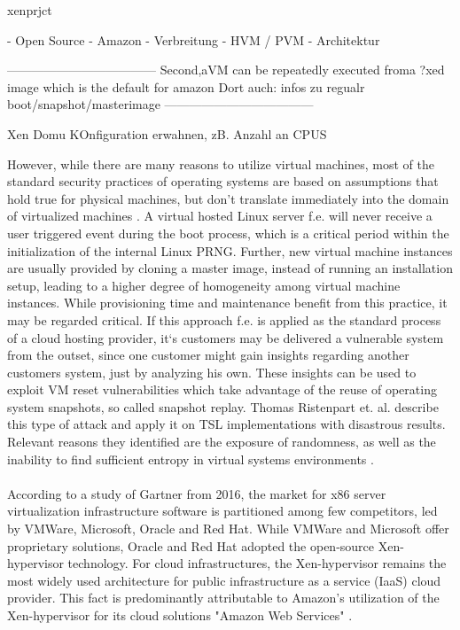 xenprjct

- Open Source
- Amazon
- Verbreitung 
- HVM / PVM
- Architektur

------------------------------------
\cite{everspaugh2014not}
Second,aVM  can be repeatedly executed froma ?xed image which is the default for amazon
Dort auch: infos zu regualr boot/snapshot/masterimage
------------------------------------

Xen Domu KOnfiguration erwahnen, zB. Anzahl an CPUS

However, while there are many reasons to utilize virtual machines, most of the standard security practices of operating systems are based on assumptions that hold true for physical machines, but don't translate immediately into the domain of virtualized machines \cite{kerrigan2012study}. A virtual hosted Linux server f.e. will never receive a user triggered event during the boot process, which is a critical period within the initialization of the internal Linux PRNG. Further, new virtual machine instances are usually provided by cloning a master image, instead of running an installation setup, leading to a higher degree of homogeneity among virtual machine instances. While provisioning time and maintenance benefit from this practice, it may be regarded critical. If this approach f.e. is applied as the standard process of a cloud hosting provider, it`s customers may be delivered a vulnerable system from the outset, since one customer might gain insights regarding another customers system, just by analyzing his own. These insights can be used to exploit VM reset vulnerabilities which take advantage of the reuse of  operating system snapshots, so called snapshot replay. Thomas Ristenpart et. al. describe this type of attack and apply it on TSL implementations with disastrous results. Relevant reasons they identified are the exposure of randomness, as well as the inability to find sufficient entropy in virtual systems environments \cite{ristenpart2010good, ristenpart2009hey}. \\~\\
According to a study of Gartner from 2016, the market for x86 server virtualization infrastructure software is partitioned among few competitors, led by VMWare, Microsoft, Oracle and Red Hat. While VMWare and Microsoft offer proprietary solutions, Oracle and Red Hat adopted the open-source Xen-hypervisor technology. For cloud infrastructures, the Xen-hypervisor remains the most widely used architecture for public infrastructure as a service (IaaS) cloud provider. This fact is predominantly attributable to Amazon's utilization of the Xen-hypervisor for its cloud solutions "Amazon Web Services" \cite{bittman2016magic}. 

